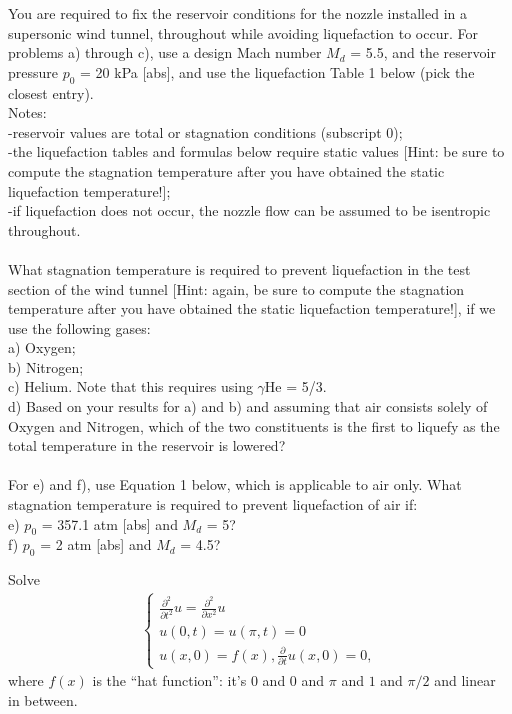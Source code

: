 \documentclass[12pt]{exam}
\newcommand{\pt}{\frac{\partial}{\partial t}}
\newcommand{\pxx}{\frac{\partial^2}{\partial x^2}}
\newcommand{\ptt}{\frac{\partial^2}{\partial t^2}}
\begin{document}
\begin{questions}
\newpage 
\begin{question}
You are required to fix the reservoir conditions for the nozzle installed in a supersonic wind tunnel,
throughout while avoiding liquefaction to occur. For problems a) through c), use a design Mach number
\(M_d\) = 5.5, and the reservoir pressure \(p_0\) = 20 kPa [abs], and use the liquefaction Table 1 below (pick
the closest entry).\\ Notes: \\
\indent -reservoir values are total or stagnation conditions (subscript 0);\\
\indent -the liquefaction tables and formulas below require static values [Hint: be sure to compute the
stagnation temperature after you have obtained the static liquefaction temperature!];\\
\indent -if liquefaction does not occur, the nozzle flow can be assumed to be isentropic throughout.\\
\\
What stagnation temperature is required to prevent liquefaction in the test section of the wind tunnel
[Hint: again, be sure to compute the stagnation temperature after you have obtained the static
liquefaction temperature!], if we use the following gases:\\
\indent a) Oxygen;\\
\indent b) Nitrogen;\\
\indent c) Helium. Note that this requires using \(\gamma\)He = 5/3.\\
\indent d) Based on your results for a) and b) and assuming that air consists solely of Oxygen and Nitrogen,
which of the two constituents is the first to liquefy as the total temperature in the reservoir is
lowered?\\ 
\\
For e) and f), use Equation 1 below, which is applicable to air only. What stagnation temperature is
required to prevent liquefaction of air if:\\
e) \(p_0\) = 357.1 atm [abs] and \(M_d\) = 5?\\
f) \(p_0\) = 2 atm [abs] and \(M_d\) = 4.5?
\end{question}
\begin{solutionorbox}[\stretch{1}]
\end{solutionorbox}


\newpage 
\begin{question}
Solve 
\begin{align*}
\begin{cases}
\ptt u = \pxx u\\ 
u(0, t) = u(\pi, t) = 0\\ 
u(x,0) = f(x), \pt u(x,0) = 0,
\end{cases}
\end{align*}
where $f(x)$ is the ``hat function'': it's $0$ and $0$ and $\pi$ and $1$ and $\pi/2$ and 
linear in between. 
\end{question}
\begin{solutionorbox}[\stretch{1}]
\end{solutionorbox}



\end{questions}
\end{document}
